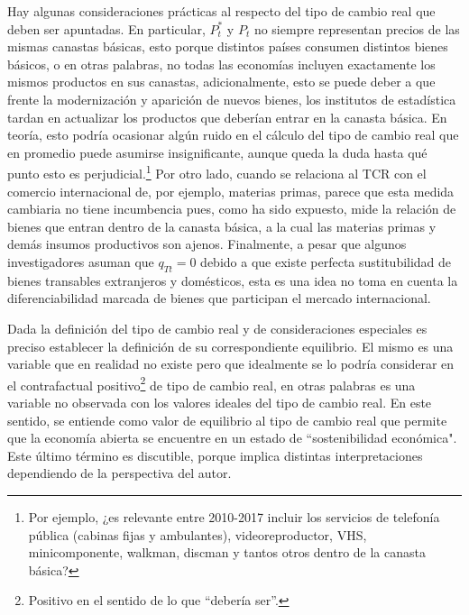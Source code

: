 \documentclass[12pt,letterpaper]{article}
\begin{document}
Hay algunas consideraciones prácticas al respecto del tipo de cambio real que deben ser apuntadas. En particular, $P_t^*$ y $P_t$ no siempre representan precios de las mismas canastas básicas, esto porque distintos países consumen distintos bienes básicos, o en otras palabras, no todas las economías incluyen exactamente los mismos productos en sus canastas, adicionalmente, esto se puede deber a que frente la modernización y aparición de nuevos bienes, los institutos de estadística tardan en actualizar los productos que deberían entrar en la canasta básica. En teoría, esto podría ocasionar algún ruido en el cálculo del tipo de cambio real que en promedio puede asumirse insignificante, aunque queda la duda hasta qué punto esto es perjudicial.\footnote{Por ejemplo, ¿es relevante entre 2010-2017 incluir los servicios de telefonía pública (cabinas fijas y ambulantes), videoreproductor, VHS, minicomponente, walkman, discman y tantos otros dentro de la canasta básica?} Por otro lado, cuando se relaciona al TCR con el comercio internacional de, por ejemplo, materias primas, parece que esta medida cambiaria no tiene incumbencia pues, como ha sido expuesto, mide la relación de bienes que entran dentro de la canasta básica, a la cual las materias primas y demás insumos productivos son ajenos. Finalmente, a pesar que algunos investigadores asuman que $q_{Tt}=0$ debido a que existe perfecta sustitubilidad de bienes transables extranjeros y domésticos, esta es una idea no toma en cuenta la diferenciabilidad marcada de bienes que participan el mercado internacional. %

Dada la definición del tipo de cambio real y de consideraciones especiales es preciso establecer la definición de su correspondiente equilibrio. El mismo es una variable que en realidad no existe pero que idealmente se lo podría considerar en el contrafactual positivo\footnote{Positivo en el sentido de lo que ``debería ser''.} de tipo de cambio real, en otras palabras es una variable no observada con los valores ideales del tipo de cambio real. En este sentido, se entiende como valor de equilibrio al tipo de cambio real que permite que la economía abierta se encuentre en un estado de ``sostenibilidad económica". Este último término es discutible, porque implica distintas interpretaciones dependiendo de la perspectiva del autor.
\end{document}
